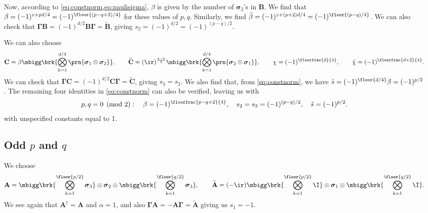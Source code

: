 \documentclass[11pt]{article}
\newcommand{\hc}{^\dag}
\newcommand{\Gammab}{\boldsymbol{\Gamma}}
\newcommand{\A}{\mathbf{A}}
\newcommand{\B}{\mathbf{B}}
\renewcommand{\C}{\mathbf{C}}
\newcommand{\At}{\widetilde{\A}}
\newcommand{\Bt}{\widetilde{\B}}
\newcommand{\Ct}{\widetilde{\C}}
\newcommand{\sigmab}{\boldsymbol{\sigma}}
\newcommand{\betat}{\tilde{\beta}}
\newcommand{\chit}{\tilde{\chi}}
\newcommand{\sh}{\hat{s}}
\begin{document}
Now, according to \cref{eq:constnorm,eq:paulisigma}, \(\beta\) is given by the number of \(\sigmab_2\)'s in \(\B\).
We find that \( \beta = (-1)^{z + pd/4} = (-1)^{\floor{(p-q+2)/4}} \) for these values of \(p,q\).
Similarly, we find \( \betat = (-1)^{z + (p+2)d/4} = (-1)^{\floor{(p-q)/4}} \).
We can also check that \(\Gammab \B = (-1)^{d/2}\B \Gammab = \Bt\), giving \(s_2 = (-1)^{d/2} = (-1)^{(p-q)/2}\).

We can also choose
%
\begin{equation*}
  \C =  \beta \mbigg\brk{\bigotimes_{k=1}^{d/4} \prn{\sigmab_1 \otimes \sigmab_2}},
  \qquad
  \Ct = (\ir)^{\frac{q-p}{2}}
        \mbigg\brk{\bigotimes_{k=1}^{d/4} \prn{\sigmab_2 \otimes \sigmab_1}},
  \qquad
  \chi = (-1)^{\floorfrac{d}{4}},
  \qquad
  \chit = (-1)^{\floorfrac{d+2}{4}}.
\end{equation*}
%
We can check that \(\Gammab \C = (-1)^{d/2}\C \Gammab = \Ct\), giving \(s_3 = s_2\).
We also find that, from \cref{eq:constnorm}, we have
\( \sh = (-1)^{\floor{d/4}} \beta = (-1)^{p/2} \).
The remaining four identities in \cref{eq:constnorm} can also be verified, leaving us with
%
\begin{equation}\label{eq:consteveneven}
  p, q = 0 \pmod 2 : \quad
  \beta = (-1)^{\floorfrac{p-q+2}{4}}, \quad
  s_2 = s_3 = (-1)^{(p-q)/2}, \quad
  \sh = (-1)^{p/2}.
\end{equation}
%
with unspecified constants equal to 1.


\subsection{Odd \texorpdfstring{\(p\) and \(q\)}{p and q}}\label{sec:oddodd}

We choose
%
\begin{equation*}
  \A =  \mbigg\brk{\bigotimes_{k=1}^{\floor{p/2}} \sigmab_3}
        \otimes \sigmab_2
        \otimes \mbigg\brk{\bigotimes_{k=1}^{\floor{q/2}} \sigmab_3},
  \qquad
  \At = (-\ir)
        \mbigg\brk{\bigotimes_{k=1}^{\floor{p/2}} \I}
        \otimes \sigmab_1
        \otimes \mbigg\brk{\bigotimes_{k=1}^{\floor{q/2}} \I}.
\end{equation*}
%
We see again that \(\A\hc = \A\) and \(\alpha=1\), and also \(\Gammab \A = - \A \Gammab =  \At\) giving us \(s_1 = -1\).
\end{document}
